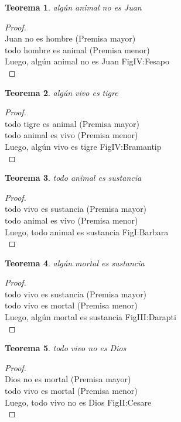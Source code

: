 ﻿\documentclass[12pt]{book}
\newtheorem{theorem}{Teorema}[chapter]
\newtheorem{proof}{Demostración}
\begin{document}
\begin{theorem}
algún animal no es Juan
\label{th: 21}
\end{theorem}\begin{proof}\\Juan no es hombre	 (Premisa mayor) \\todo hombre es animal	 (Premisa menor) \\Luego, algún animal no es Juan	FigIV:Fesapo \\ \end{proof}
\begin{theorem}
algún vivo es tigre
\label{th: 22}
\end{theorem}\begin{proof}\\todo tigre es animal	 (Premisa mayor) \\todo animal es vivo	 (Premisa menor) \\Luego, algún vivo es tigre	FigIV:Bramantip \\ \end{proof}
\begin{theorem}
todo animal es sustancia
\label{th: 23}
\end{theorem}\begin{proof}\\todo vivo es sustancia	 (Premisa mayor) \\todo animal es vivo	 (Premisa menor) \\Luego, todo animal es sustancia	FigI:Barbara \\ \end{proof}
\begin{theorem}
algún mortal es sustancia
\label{th: 24}
\end{theorem}\begin{proof}\\todo vivo es sustancia	 (Premisa mayor) \\todo vivo es mortal	 (Premisa menor) \\Luego, algún mortal es sustancia	FigIII:Darapti \\ \end{proof}
\begin{theorem}
todo vivo no es Dios
\label{th: 25}
\end{theorem}\begin{proof}\\Dios no es mortal	 (Premisa mayor) \\todo vivo es mortal	 (Premisa menor) \\Luego, todo vivo no es Dios	FigII:Cesare \\ \end{proof}
\end{document}
